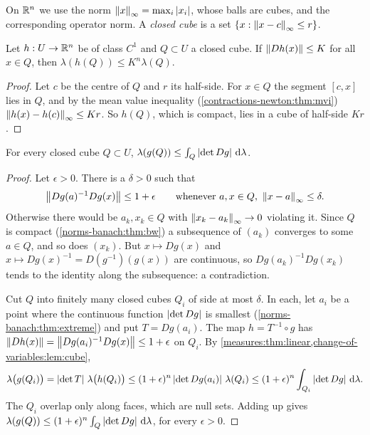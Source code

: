 \begin{notechapter}
On $\mathbb{R}^n$ we use the norm $\left\|x\right\|_\infty = \max_i\left|x_i\right|$, whose
balls are cubes, and the corresponding operator norm. A \emph{closed
cube} is a set $\{x : \left\|x - c\right\|_\infty\leq r\}$.

\begin{lemma}\label{change-of-variables:lem:cube}
Let $h:U\to\mathbb{R}^n$ be of class $C^1$ and $Q\subset U$ a closed cube. If
$\left\|Dh(x)\right\|\leq K$ for all $x\in Q$, then
$\lambda(h(Q))\leq K^n\lambda(Q)$.
\end{lemma}

\begin{proof}
Let $c$ be the centre of $Q$ and $r$ its half-side. For $x\in Q$ the
segment $[c, x]$ lies in $Q$, and by the mean value inequality
(\cref{contractions-newton:thm:mvi})
$\left\|h(x) - h(c)\right\|_\infty\leq Kr$. So $h(Q)$, which is compact, lies in
a cube of half-side $Kr$.
\end{proof}

\begin{lemma}\label{change-of-variables:lem:local}
For every closed cube $Q\subset U$,
$\lambda(g(Q))\leq\int_Q\left|\det Dg\right|\,\mathrm{d}\lambda$.
\end{lemma}

\begin{proof}
Let $\epsilon > 0$. There is a $\delta > 0$ such that
\[
  \left\|Dg(a)^{-1}Dg(x)\right\|\leq1 + \epsilon
  \qquad\text{whenever }a, x\in Q,\ \left\|x - a\right\|_\infty\leq\delta .
\]
Otherwise there would be $a_k, x_k\in Q$ with
$\left\|x_k - a_k\right\|_\infty\to0$ violating it. Since $Q$ is compact
(\cref{norms-banach:thm:bw}) a subsequence of $(a_k)$ converges to some
$a\in Q$, and so does $(x_k)$. But $x\mapsto Dg(x)$ and
$x\mapsto Dg(x)^{-1} = D(g^{-1})(g(x))$ are continuous, so
$Dg(a_k)^{-1}Dg(x_k)$ tends to the identity along the subsequence: a
contradiction.

Cut $Q$ into finitely many closed cubes $Q_i$ of side at most $\delta$.
In each, let $a_i$ be a point where the continuous function
$\left|\det Dg\right|$ is smallest (\cref{norms-banach:thm:extreme}) and put
$T = Dg(a_i)$. The map $h = T^{-1}\circ g$ has
$\left\|Dh(x)\right\| = \left\|Dg(a_i)^{-1}Dg(x)\right\|\leq1 + \epsilon$ on $Q_i$. By
\cref{measures:thm:linear,change-of-variables:lem:cube},
\[
  \lambda\bigl(g(Q_i)\bigr) = \left|\det T\right|\,\lambda\bigl(h(Q_i)\bigr)
  \leq(1 + \epsilon)^n\left|\det Dg(a_i)\right|\,\lambda(Q_i)
  \leq(1 + \epsilon)^n\int_{Q_i}\left|\det Dg\right|\,\mathrm{d}\lambda .
\]
The $Q_i$ overlap only along faces, which are null sets. Adding up
gives $\lambda(g(Q))\leq(1 + \epsilon)^n\int_Q\left|\det Dg\right|\,\mathrm{d}\lambda$,
for every $\epsilon > 0$.
\end{proof}


\end{notechapter}
